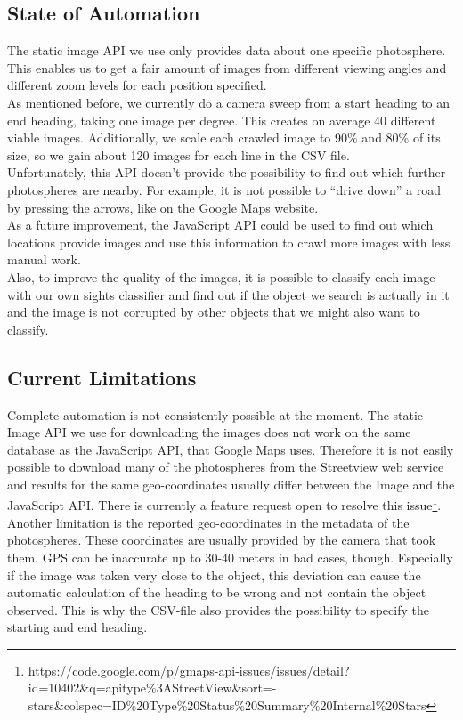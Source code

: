 \subsection{State of Automation}
The static image API we use only provides data about one specific photosphere. This enables us to get a fair amount of images from different viewing angles and different zoom levels for each position specified.\\
As mentioned before, we currently do a camera sweep from a start heading to an end heading, taking one image per degree. This creates on average 40 different viable images. Additionally, we scale each crawled image to 90\% and 80\% of its size, so we gain about 120 images for each line in the CSV file.\\
Unfortunately, this API doesn't provide the possibility to find out which further photospheres are nearby. For example, it is not possible to ``drive down'' a road by pressing the arrows, like on the Google Maps website.\\
As a future improvement, the JavaScript API could be used to find out which locations provide images and use this information to crawl more images with less manual work.\\
Also, to improve the quality of the images, it is possible to classify each image with our own sights classifier and find out if the object we search is actually in it and the image is not corrupted by other objects that we might also want to classify.

\subsection{Current Limitations}
Complete automation is not consistently possible at the moment. The static Image API we use for downloading the images does not work on the same database as the JavaScript API, that Google Maps uses. Therefore it is not easily possible to download many of the photospheres from the Streetview web service and results for the same geo-coordinates usually differ between the Image and the JavaScript API. There is currently a feature request open to resolve this issue\footnote{https://code.google.com/p/gmaps-api-issues/issues/detail?id=10402\&q=apitype\%3AStreetView\&sort=-stars\&colspec=ID\%20Type\%20Status\%20Summary\%20Internal\%20Stars}.\\
Another limitation is the reported geo-coordinates in the metadata of the photospheres. These coordinates are usually provided by the camera that took them. GPS can be inaccurate up to 30-40 meters in bad cases, though. Especially if the image was taken very close to the object, this deviation can cause the automatic calculation of the heading to be wrong and not contain the object observed. This is why the CSV-file also provides the possibility to specify the starting and end heading.

